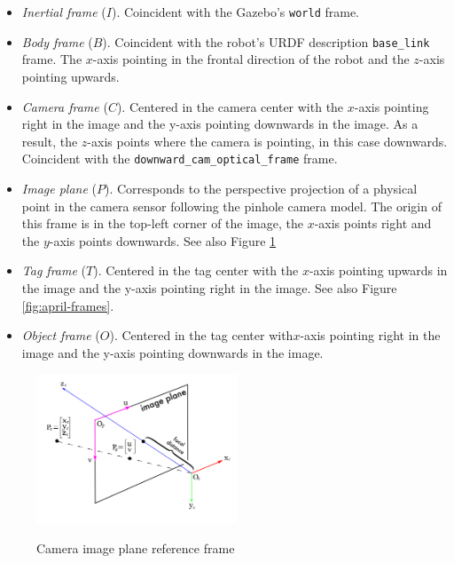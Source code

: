 \begin{itemize}
	\item \emph{Inertial frame} ($I$). Coincident with the Gazebo's \texttt{world} frame.
	
	\item \emph{Body frame} ($B$). Coincident with the robot's URDF description \texttt{base\_link} frame. The $x$-axis pointing in the frontal direction of the robot and the $z$-axis pointing upwards.
	
	\item \emph{Camera frame} ($C$). Centered in the camera center with the $x$-axis pointing right in the image and the y-axis pointing downwards in the image. As a result, the $z$-axis points where the camera is pointing, in this case downwards. Coincident with the \texttt{downward\_cam\_optical\_frame} frame.
	
	\item \emph{Image plane} ($P$). Corresponds to the perspective projection of a physical point in the camera sensor following the pinhole camera model. The origin of this frame is in the top-left corner of the image, the $x$-axis points right and the $y$-axis points downwards. See also Figure \ref{fig:image_plane}
	
	\item \emph{Tag frame} ($T$). Centered in the tag center with the $x$-axis pointing upwards in the image and the y-axis pointing right in the image. See also Figure \ref{fig:april-frames}.
	
	\item \emph{Object frame} ($O$). Centered in the tag center with$x$-axis pointing right in the image and the y-axis pointing downwards in the image.
\end{itemize}

\begin{figure}[ht]
	\caption{Camera image plane reference frame}
	\centering
	\includegraphics[keepaspectratio, width=6cm]{content/chapter_02/images/image_plane.png}
	\label{fig:image_plane}
\end{figure}

